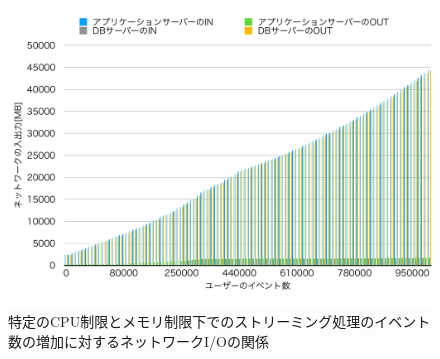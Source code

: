 \documentclass[../../../../../../main]{subfiles}
\begin{document}
    \begin{figure}[H]
        \centering
        \includegraphics[width=12cm]{graph}
        \caption{特定のCPU制限とメモリ制限下でのストリーミング処理のイベント数の増加に対するネットワークI/Oの関係}
        \label{fig:stream-netio-app_1_1024-db_1_1024}
    \end{figure}
\end{document}
